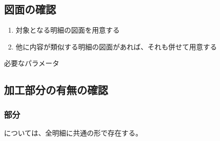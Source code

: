 \subsection{図面の確認}
\begin{enumerate}[label=\sarrow]
\item 対象となる明細の図面を用意する
\item 他に内容が類似する明細の図面があれば、それも併せて用意する
\end{enumerate}
\begin{Parameter}{必要なパラメータ}
\PMDrawingExists%
\PMDrawingNumber%
\end{Parameter}


\subsection{加工部分の有無の確認}

\subsubsection{\EndFacecutMilling 部分}
\EndFacecutMilling については、全明細に共通の形で存在する。


